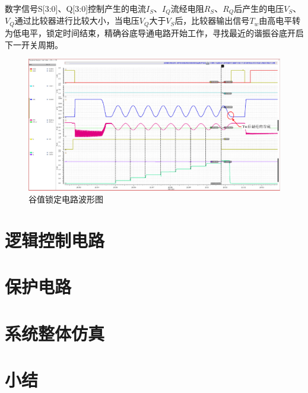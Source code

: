 数字信号S[3:0]、Q[3:0]控制产生的电流$I_S$、$I_Q$流经电阻$R_S$、$R_Q$后产生的电压$V_S$、$V_Q$通过比较器进行比较大小，当电压$V_Q$大于$V_S$后，比较器输出信号$T_w$由高电平转为低电平，锁定时间结束，精确谷底导通电路开始工作，寻找最近的谐振谷底开启下一开关周期。

\begin{figure}[htbp] 
    \centering
    \includegraphics[width=0.8\linewidth]{figures/valley_lock.pdf}
    \caption{谷值锁定电路波形图}
    \label{fig:valley_lock}
\end{figure} 

\section{逻辑控制电路}

\section{保护电路}

\section{系统整体仿真}

\section{小结}




